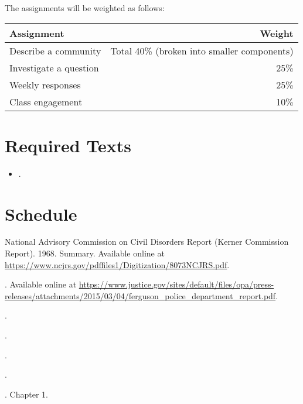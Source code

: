 \documentclass[11pt]{syllabus}
\begin{document}
\noindent The assignments will be weighted as follows:

\begin{center}
\begin{tabular}{lr}
\textbf{Assignment} & \textbf{Weight}\\\toprule
Describe a community & Total 40\% (broken into smaller components) \\
Investigate a question & 25\%\\
Weekly responses & 25\%\\
Class engagement & 10\%\\\bottomrule
\end{tabular}
\end{center}

\showgrades


\section{Required Texts}
\begin{itemize}
    \item {}.
\end{itemize}

\section{Schedule}

\begin{readings}
\item National Advisory Commission on Civil Disorders Report (Kerner Commission Report). 1968. Summary. Available online at \url{https://www.ncjrs.gov/pdffiles1/Digitization/8073NCJRS.pdf}.
\item {}. Available online at \url{https://www.justice.gov/sites/default/files/opa/press-releases/attachments/2015/03/04/ferguson_police_department_report.pdf}.
\item {}.
\end{readings}

\begin{readings}
\item {}.
\item {}.
\item {}.
\item {}. Chapter 1.
\end{readings}
\end{document}
